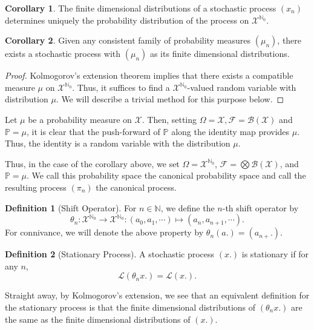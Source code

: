 \documentclass[]{article}
\theoremstyle{definition}
\newtheorem{corollary}{Corollary}[theorem]
\theoremstyle{definition}
\newtheorem{definition}{Definition}[section]
\begin{document}
\begin{corollary}
  The finite dimensional distributions of a stochastic process \((x_n)\) determines 
  uniquely the probability distribution of the process on \(\mathcal{X}^{\mathbb{N}_0}\).
\end{corollary}

\begin{corollary}
  Given any consistent family of probability measures \((\mu_n)\), there exists a 
  stochastic process with \((\mu_n)\) as its finite dimensional distributions.
\end{corollary}
\begin{proof}
  Kolmogorov's extension theorem implies that there exists a compatible measure 
  \(\mu\) on \(\mathcal{X}^{\mathbb{N}_0}\). Thus, it suffices to find 
  a \(\mathcal{X}^{\mathbb{N}_0}\)-valued random variable with distribution 
  \(\mu\). We will describe a trivial method for this purpose below.
\end{proof}

Let \(\mu\) be a probability measure on \(\mathcal{X}\). Then, setting 
\(\Omega = \mathcal{X}, \mathcal{F} = \mathcal{B}(\mathcal{X})\) and \(\mathbb{P} = \mu\),
it is clear that the push-forward of \(\mathbb{P}\) along the identity map 
provides \(\mu\). Thus, the identity is a random variable with the distribution 
\(\mu\).

Thus, in the case of the corollary above, we set \(\Omega = \mathcal{X}^{\mathbb{N}_0}\),
\(\mathcal{F} = \bigotimes\mathcal{B}(\mathcal{X})\), and \(\mathbb{P} = \mu\). 
We call this probability space the canonical probability space and call the 
resulting process \((\pi_n)\) the canonical process.

\begin{definition}[Shift Operator]
  For \(n \in \mathbb{N}\), we define the \(n\)-th shift operator by 
  \[\theta_n : \mathcal{X}^{\mathbb{N}_0} \to \mathcal{X}^{\mathbb{N}_0} : 
    (a_0, a_1, \cdots) \mapsto (a_n, a_{n + 1}, \cdots).\]
  For connivance, we will denote the above property by \(\theta_n(a.) = (a_{n +}.)\). 
\end{definition}

\begin{definition}[Stationary Process]
  A stochastic process \((x.)\) is stationary if for any \(n\), 
  \[\mathcal{L}(\theta_n x.) = \mathcal{L}(x.).\]
\end{definition}

Straight away, by Kolmogorov's extension, we see that an equivalent definition 
for the stationary process is that the finite dimensional distributions 
of \((\theta_n x.)\) are the same as the finite dimensional distributions of \((x.)\).
\end{document}
